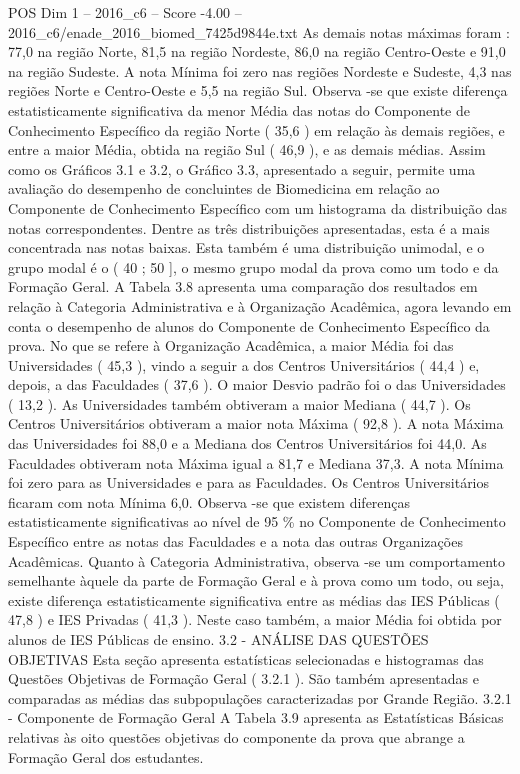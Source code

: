 \begin{textsample}{POS Dim 1 – 2016\_c6 – Score -4.00 – 2016\_c6/enade\_2016\_biomed\_7425d9844e.txt}
As demais notas máximas foram : 77,0 na região Norte, 81,5 na região Nordeste, 86,0 na região Centro-Oeste e 91,0 na região Sudeste.
A nota Mínima foi zero nas regiões Nordeste e Sudeste, 4,3 nas regiões Norte e Centro-Oeste e 5,5 na região Sul.
Observa -se que existe diferença estatisticamente significativa da menor Média das notas do Componente de Conhecimento Específico da região Norte ( 35,6 ) em relação às demais regiões, e entre a maior Média, obtida na região Sul ( 46,9 ), e as demais médias.
Assim como os Gráficos 3.1 e 3.2, o Gráfico 3.3, apresentado a seguir, permite uma avaliação do desempenho de concluintes de Biomedicina em relação ao Componente de Conhecimento Específico com um histograma da distribuição das notas correspondentes.
Dentre as três distribuições apresentadas, esta é a mais concentrada nas notas baixas.
Esta também é uma distribuição unimodal, e o grupo modal é o ( 40 ; 50 ], o mesmo grupo modal da prova como um todo e da Formação Geral.
A Tabela 3.8 apresenta uma comparação dos resultados em relação à Categoria Administrativa e à Organização Acadêmica, agora levando em conta o desempenho de alunos do Componente de Conhecimento Específico da prova.
No que se refere à Organização Acadêmica, a maior Média foi das Universidades ( 45,3 ), vindo a seguir a dos Centros Universitários ( 44,4 ) e, depois, a das Faculdades ( 37,6 ).
O maior Desvio padrão foi o das Universidades ( 13,2 ).
As Universidades também obtiveram a maior Mediana ( 44,7 ).
Os Centros Universitários obtiveram a maior nota Máxima ( 92,8 ).
A nota Máxima das Universidades foi 88,0 e a Mediana dos Centros Universitários foi 44,0.
As Faculdades obtiveram nota Máxima igual a 81,7 e Mediana 37,3.
A nota Mínima foi zero para as Universidades e para as Faculdades.
Os Centros Universitários ficaram com nota Mínima 6,0.
Observa -se que existem diferenças estatisticamente significativas ao nível de 95 \% no Componente de Conhecimento Específico entre as notas das Faculdades e a nota das outras Organizações Acadêmicas.
Quanto à Categoria Administrativa, observa -se um comportamento semelhante àquele da parte de Formação Geral e à prova como um todo, ou seja, existe diferença estatisticamente significativa entre as médias das IES Públicas ( 47,8 ) e IES Privadas ( 41,3 ).
Neste caso também, a maior Média foi obtida por alunos de IES Públicas de ensino. 3.2 - ANÁLISE DAS QUESTÕES OBJETIVAS Esta seção apresenta estatísticas selecionadas e histogramas das Questões Objetivas de Formação Geral ( 3.2.1 ).
São também apresentadas e comparadas as médias das subpopulações caracterizadas por Grande Região. 3.2.1 - Componente de Formação Geral A Tabela 3.9 apresenta as Estatísticas Básicas relativas às oito questões objetivas do componente da prova que abrange a Formação Geral dos estudantes.

\end{textsample}
